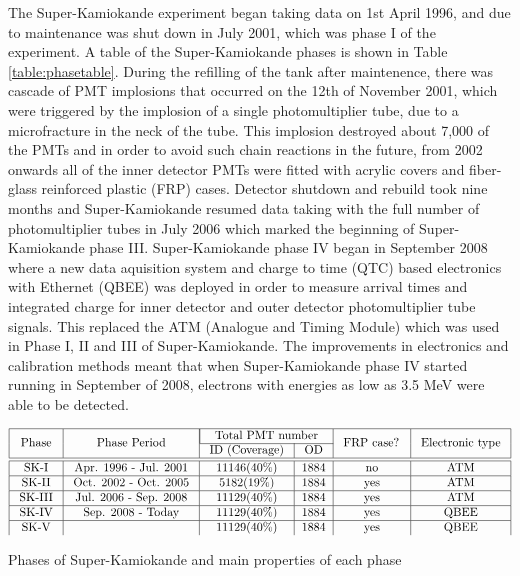 The Super-Kamiokande experiment began taking data on 1st April 1996, and due to maintenance was shut down in July 2001, which was phase I of the experiment. A table of the Super-Kamiokande phases is shown in Table \ref{table:phasetable}. During the refilling of the tank after maintenence, there was cascade of PMT implosions that occurred on the 12th of November 2001, which were triggered by the implosion of a single photomultiplier tube, due to a microfracture in the neck of the tube. This implosion destroyed about 7,000 of the PMTs and in order to avoid such chain reactions in the future, from 2002 onwards all of the inner detector PMTs were fitted with acrylic covers and fiber-glass reinforced plastic (FRP) cases. Detector shutdown and rebuild took nine months and Super-Kamiokande resumed data taking with the full number of photomultiplier tubes in July 2006 which marked the beginning of Super-Kamiokande phase III. Super-Kamiokande phase IV began in September 2008 where a new data aquisition system and charge to time (QTC) based electronics with Ethernet (QBEE) was deployed in order to measure arrival times and integrated charge for inner detector and outer detector photomultiplier tube signals. This replaced the ATM (Analogue and Timing Module) which was used in Phase I, II and III of Super-Kamiokande. The improvements in electronics and calibration methods meant that when Super-Kamiokande phase IV started running in September of 2008, electrons with energies as low as 3.5 MeV were able to be detected.

\begin{table}[htp]
    \centering
    $$
\begin{array}{|c|c|c|c|c|c|}
    \hline \multirow{2}{*}{\text { Phase }} & \multirow{2}{*}{\text { Phase Period }} & \multicolumn{2}{|c|}{\text { Total PMT number  }} & \multirow{2}{*}{\text { FRP case? }} & \multirow{2}{*}{\text { Electronic type }} \tabularnewline
    \cline {3-4} & &  \text { ID (Coverage) } & \text { OD } & & \tabularnewline
    \hline \hline \text { SK-I } & \text { Apr. 1996 - Jul. 2001 } & 11146(40 \%) & 1884 & \text { no } & \text { ATM } \\
    \hline \text { SK-II } & \text { Oct. 2002 - Oct. 2005 } & 5182(19 \%) & 1884 & \text { yes } & \text { ATM } \\
    \hline \text { SK-III } & \text { Jul. 2006 - Sep. 2008 } & 11129(40 \%) & 1884 & \text { yes } & \text { ATM } \\
    \hline \text { SK-IV } & \text { Sep. 2008 - Today } & 11129(40 \%) & 1884 & \text { yes } & \text { QBEE } \\
    \hline \text {SK-V}    &  \text{} &  11129(40 \%) & 1884 & \text { yes } & \text { QBEE } \\
\end{array}
    $$
\caption{Phases of Super-Kamiokande and main properties of each phase }
\label{table:phasetable}
\end{table}



